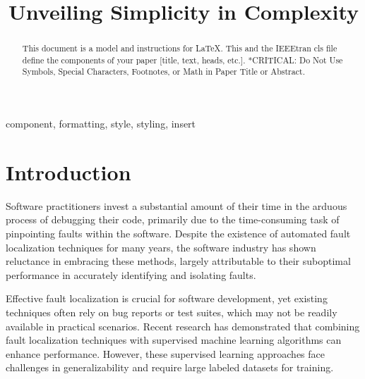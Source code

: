 \documentclass[10pt,conference]{IEEEtran}
\begin{document}
	
	\title{Unveiling Simplicity in Complexity\\
		
	}
	
	\author{
		
	}
	
	\maketitle
	
	\begin{abstract}
		This document is a model and instructions for \LaTeX.
		This and the IEEEtran cls file define the components of your paper [title, text, heads, etc.]. *CRITICAL: Do Not Use Symbols, Special Characters, Footnotes, 
		or Math in Paper Title or Abstract.
	\end{abstract}
	
	\begin{IEEEkeywords}
		component, formatting, style, styling, insert
	\end{IEEEkeywords}
	
	\section{Introduction}
	Software practitioners invest a substantial amount of their time in the arduous process of debugging their code, primarily due to the time-consuming task of pinpointing faults within the software. Despite the existence of automated fault localization techniques for many years, the software industry has shown reluctance in embracing these methods, largely attributable to their suboptimal performance in accurately identifying and isolating faults.
	
	Effective fault localization is crucial for software development, yet existing techniques often rely on bug reports or test suites, which may not be readily available in practical scenarios. Recent research has demonstrated that combining fault localization techniques with supervised machine learning algorithms can enhance performance. However, these supervised learning approaches face challenges in generalizability and require large labeled datasets for training.
	
\end{document}
